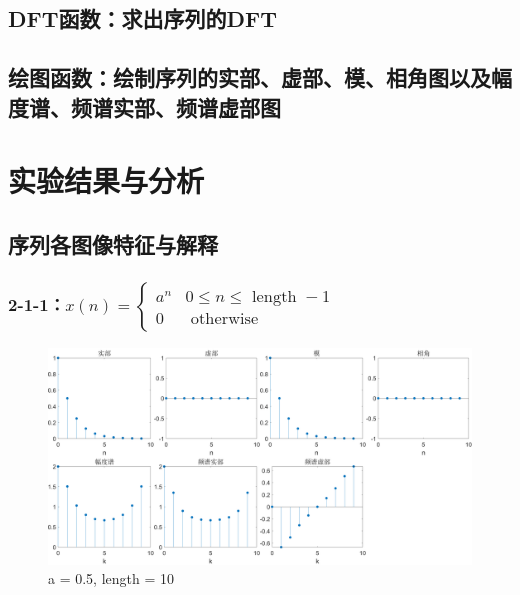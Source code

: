 \documentclass{../source/Experiment}
\begin{document}
            
            
            

            \subsection{DFT函数：求出序列的DFT}
            

            \subsection{绘图函数：绘制序列的实部、虚部、模、相角图以及幅度谱、频谱实部、频谱虚部图}
            

    \section{实验结果与分析}
        \subsection{序列各图像特征与解释}

            \subsubsection{2-1-1：$x(n)= \begin{cases}a^{n} & 0 \leq n \leq \text { length }-1 \\ 0 & \text { otherwise }\end{cases}$}

            \begin{figure}[H]
                \centering
                \includegraphics[width = \textwidth]{src/2_1_1a}
                \caption{a = 0.5, length = 10}
            \end{figure}
            
\end{document}
